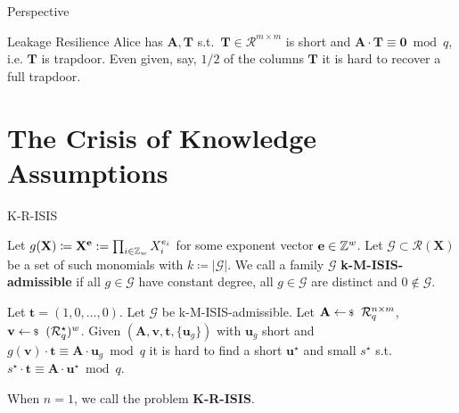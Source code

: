 \documentclass[xcolor=table,10pt,aspectratio=169]{beamer}
\renewcommand{\vec}[1]{\ensuremath{\mathbf{#1}}\xspace}
\providecommand{\mat}[1]{\ensuremath{\vec{#1}}\xspace}
\providecommand{\ring}[0]{\ensuremath{\mathcal{R}}\xspace}
\begin{document}
\begin{frame}[label={sec:orge533f21}]{Perspective}
\begin{alertblock}{Leakage Resilience}
Alice has \(\mat{A}, \mat{T}\) s.t. \(\mat{T} \in \ring^{m \times m}\) is short and \(\mat{A} \cdot \mat{T} \equiv \mat{0} \bmod q\), i.e. \(\mat{T}\) is trapdoor. Even given, say, \(1/2\) of the columns \(\mat{T}\) it is hard to recover a full trapdoor.
\end{alertblock}
\end{frame}

\section{The Crisis of Knowledge Assumptions}
\label{sec:org3e44936}
\begin{frame}[label={sec:orgf37b682}]{K-R-ISIS}
\begin{definition}
Let \(g(\vec{X}) \coloneqq  \vec{X}^{\vec{e}} := \prod_{i \in \ZZ_w} X_i^{e_i}\) for some exponent vector \(\vec{e} \in \ZZ^w\). Let \(\mathcal{G} \subset \mathcal{R}(\vec{X})\) be a set of such monomials with \(k \coloneqq |\mathcal{G}|\). We call a family \(\mathcal{G}\) \textbf{k-M-ISIS-admissible} if all \(g \in \mathcal{G}\) have constant degree, all \(g \in \mathcal{G}\) are distinct and \(0 \not\in\mathcal{G}\).
\end{definition}

\begin{definition}
Let \(\vec{t} = (1,0,\ldots,0)\).
Let \(\mathcal{G}\) be k-M-ISIS-admissible.
Let  \(\mat{A} \sample \ring_q^{n \times m}\), \(\vec{v} \sample (\ring_q^\star)^w\). Given \((\mat{A}, \vec{v}, \vec{t}, \{\vec{u}_{g}\})\) with \(\vec{u}_{g}\) short and \(g(\vec{v}) \cdot \vec{t} \equiv \mat{A}\cdot \vec{u}_{g} \bmod q\) it is hard to find a short \(\vec{u}^{\star}\) and small \(s^{\star}\) s.t. \(s^\star \cdot \vec{t} \equiv \mat{A} \cdot \vec{u}^{\star} \bmod q.\)

When \(n = 1\), we call the problem \textbf{K-R-ISIS}.
\end{definition}

{\footnotesize {} \par}
\end{frame}
\end{document}
